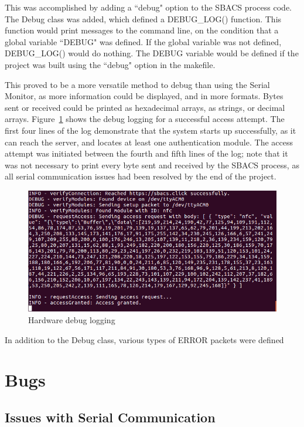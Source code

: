 \documentclass[12pt]{report}
\let\Oldsection\section
\renewcommand{\section}{\FloatBarrier\Oldsection}
\let\Oldsubsection\subsection
\renewcommand{\subsection}{\FloatBarrier\Oldsubsection}
\begin{document}
This was accomplished by adding a ``debug" option to the SBACS process code. The Debug class was added, which defined a 
DEBUG\_LOG() function. This function would print messages to the command line, on the condition that a global variable 
``DEBUG" was defined. If the global variable was not defined, DEBUG\_LOG() would do nothing. The DEBUG variable would be 
defined if the project was built using the ``debug" option in the makefile.

This proved to be a more versatile method to debug than using the Serial Monitor, as more information could be 
displayed, and in more formats. Bytes sent or received could be printed as hexadecimal arrays, as strings, or decimal 
arrays. Figure~\ref{fig:hardware-debug-logging} shows the debug logging for a successful access attempt. The first four 
lines of the log demonstrate that the system starts up successfully, as it can reach the server, and locates at least 
one authentication module. The access attempt was initiated between the fourth and fifth lines of the log; note that it 
was not necessary to print every byte sent and received by the SBACS process, as all serial communication issues 
had been resolved by the end of the project.

\begin{figure}
    \includegraphics[width=\textwidth]{Diagrams/Hardware-Diagrams/access_granted}
    \caption{Hardware debug logging}
    \label{fig:hardware-debug-logging}
\end{figure}

In addition to the Debug class, various types of ERROR packets were defined

\section{Bugs} \label{bugs}

\subsection{Issues with Serial Communication} \label{issues-with-serial-communcation}
\end{document}
